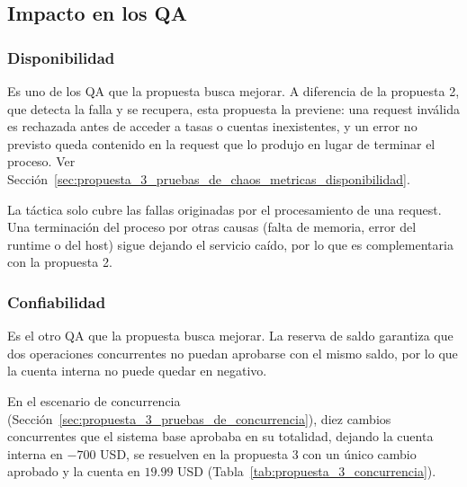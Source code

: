     \begin{code}
        
        \caption{Reserva de saldo en \texttt{app/exchange.js}. Comparar con el Código~\ref{lst:race_condition}.}
        \label{lst:p3_reservation}
    \end{code}

    \subsection{Impacto en los QA}
    \label{sec:propuesta_3_impacto_en_los_qa}

        \subsubsection{Disponibilidad}
        \label{sec:propuesta_3_disponibilidad}

        Es uno de los QA que la propuesta busca mejorar. A diferencia de la propuesta 2, que detecta la falla y se recupera, esta
        propuesta la previene: una request inválida es rechazada antes de acceder a tasas o cuentas inexistentes, y un error no
        previsto queda contenido en la request que lo produjo en lugar de terminar el proceso.
        Ver Sección~\ref{sec:propuesta_3_pruebas_de_chaos_metricas_disponibilidad}.

        La táctica solo cubre las fallas originadas por el procesamiento de una request. Una terminación del proceso por otras
        causas (falta de memoria, error del runtime o del host) sigue dejando el servicio caído, por lo que es complementaria
        con la propuesta 2.

        \subsubsection{Confiabilidad}
        \label{sec:propuesta_3_confiabilidad}

        Es el otro QA que la propuesta busca mejorar. La reserva de saldo garantiza que dos operaciones concurrentes no puedan
        aprobarse con el mismo saldo, por lo que la cuenta interna no puede quedar en negativo.

        En el escenario de concurrencia (Sección~\ref{sec:propuesta_3_pruebas_de_concurrencia}), diez cambios concurrentes
        que el sistema base aprobaba en su totalidad, dejando la cuenta interna en $-700$ USD, se resuelven en la propuesta 3
        con un único cambio aprobado y la cuenta en $19.99$ USD (Tabla~\ref{tab:propuesta_3_concurrencia}).

